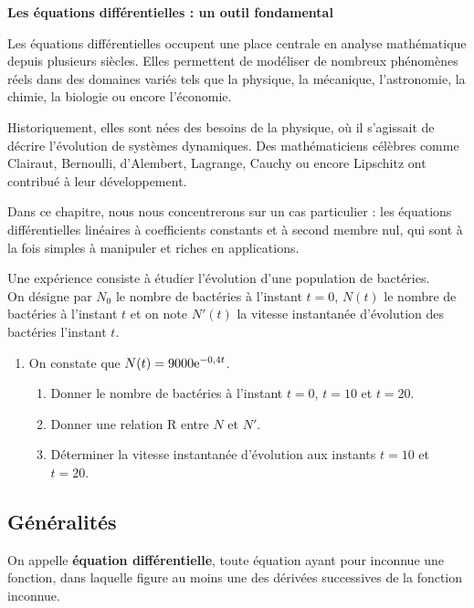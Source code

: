 
\everymath{\displaystyle}

\textbf{Les équations différentielles : un outil fondamental}

Les équations différentielles occupent une place centrale en analyse mathématique depuis plusieurs siècles. Elles permettent de modéliser de nombreux phénomènes réels dans des domaines variés tels que la physique, la mécanique, l’astronomie, la chimie, la biologie ou encore l’économie.

Historiquement, elles sont nées des besoins de la physique, où il s’agissait de décrire l’évolution de systèmes dynamiques. Des mathématiciens célèbres comme Clairaut, Bernoulli, d’Alembert, Lagrange, Cauchy ou encore Lipschitz ont contribué à leur développement.

\medskip

Dans ce chapitre, nous nous concentrerons sur un cas particulier : les équations différentielles linéaires à coefficients constants et à second membre nul, qui sont à la fois simples à manipuler et riches en applications.

\begin{lemma}
Une expérience consiste à étudier l'évolution d'une population de bactéries.\\ On désigne par $ N_{0} $  le nombre de bactéries à l'instant $ t=0 $,  $ N(t) $ le nombre de bactéries à l'instant $ t $
 et  on note $ N'(t) $ la vitesse instantanée  d'évolution   des bactéries l'instant $ t $.
 \begin{enumerate}
 \item On constate que $ N(t)=9000\mathrm{e}^{-0,4t} $.
 \begin{enumerate}
 \item Donner le nombre de bactéries à l'instant $ t=0 $, $ t=10 $ et $ t=20 $.
 \item Donner une relation R entre $N $ et $N' $.
 \item Déterminer la vitesse instantanée  d'évolution  aux instants $ t=10 $ et $ t=20 $.
 \end{enumerate}
 \end{enumerate}

\end{lemma}
 
 
 \subsection{Généralités}
\begin{definition}
  On appelle  \textbf{équation différentielle}, toute équation ayant pour inconnue une fonction, dans laquelle figure au moins une des dérivées successives de la fonction inconnue.
\end{definition}


